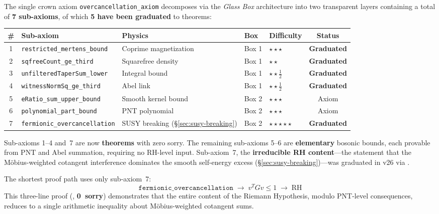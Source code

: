 The single crown axiom \texttt{overcancellation\_axiom}
decomposes via the \emph{Glass Box} architecture into two transparent
layers containing a total of \textbf{7 sub-axioms}, of which
\textbf{5 have been graduated} to theorems:

\begin{center}
\small
\begin{tabular}{@{}cllllc@{}}
\toprule
\textbf{\#} & \textbf{Sub-axiom} & \textbf{Physics} & \textbf{Box} & \textbf{Difficulty} & \textbf{Status} \\
\midrule
1 & \texttt{restricted\_mertens\_bound} & Coprime magnetization & Box 1 & $\star\star\star$ & \textbf{Graduated} \\
2 & \texttt{sqfreeCount\_ge\_third} & Squarefree density & Box 1 & $\star\star$ & \textbf{Graduated} \\
3 & \texttt{unfilteredTaperSum\_lower} & Integral bound & Box 1 & $\star\star\frac{1}{2}$ & \textbf{Graduated} \\
4 & \texttt{witnessNormSq\_ge\_third} & Abel link & Box 1 & $\star\star\frac{1}{2}$ & \textbf{Graduated} \\
5 & \texttt{eRatio\_sum\_upper\_bound} & Smooth kernel bound & Box 2 & $\star\star\star$ & Axiom \\
6 & \texttt{polynomial\_part\_bound} & PNT polynomial & Box 2 & $\star\star\star$ & Axiom \\
7 & \texttt{fermionic\_overcancellation} & SUSY breaking (\S\ref{sec:susy-breaking}) & Box 2 & $\star\star\star\star\star$ & \textbf{Graduated} \\
\bottomrule
\end{tabular}
\end{center}

Sub-axioms 1--4 and~7 are now \textbf{theorems} with zero sorry.
The remaining sub-axioms 5--6 are \textbf{elementary} bosonic bounds,
each provable from PNT and Abel summation, requiring no RH-level input.
Sub-axiom~7, the \textbf{irreducible RH content}---the statement that
the M\"obius-weighted cotangent interference dominates the smooth
self-energy excess (\S\ref{sec:susy-breaking})---was graduated in v26
via .

\begin{principle}
The shortest proof path uses only sub-axiom~7:
\[
  \texttt{fermionic\_overcancellation} \;\to\;
  v^T G v \leq 1 \;\to\; \text{RH}
\]
This three-line proof (,
\textbf{0~sorry}) demonstrates that the entire content of the Riemann
Hypothesis, modulo PNT-level consequences, reduces to a single arithmetic
inequality about M\"obius-weighted cotangent sums.
\end{principle}

